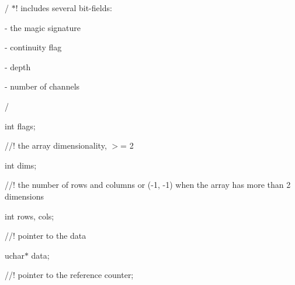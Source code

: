 {\ttfamily / $\ast$! includes several bit-\/fields\+:}

{\ttfamily }

{\ttfamily }

{\ttfamily -\/ the magic signature}

{\ttfamily }

{\ttfamily }

{\ttfamily -\/ continuity flag}

{\ttfamily }

{\ttfamily }

{\ttfamily -\/ depth}

{\ttfamily }

{\ttfamily }

{\ttfamily -\/ number of channels}

{\ttfamily  
\begin{DoxyItemize}
\item / 
\end{DoxyItemize}}

{\ttfamily }

{\ttfamily int flags;}

{\ttfamily }

{\ttfamily }

{\ttfamily //! the array dimensionality, $>$= 2}

{\ttfamily }

{\ttfamily }

{\ttfamily int dims;}

{\ttfamily }

{\ttfamily }

{\ttfamily //! the number of rows and columns or (-\/1, -\/1) when the array has more than 2 dimensions}

{\ttfamily }

{\ttfamily }

{\ttfamily int rows, cols;}

{\ttfamily }

{\ttfamily }

{\ttfamily //! pointer to the data}

{\ttfamily }

{\ttfamily }

{\ttfamily uchar$\ast$ data;}

{\ttfamily }

{\ttfamily }

{\ttfamily //! pointer to the reference counter;}

{\ttfamily }

{\ttfamily }

